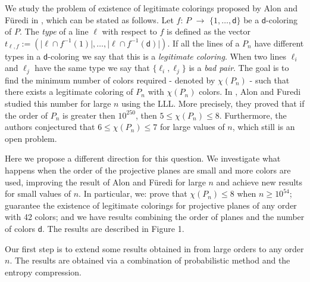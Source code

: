 \documentclass[11pt]{amsart}
\numberwithin{equation}{section}
\begin{document}
We study the problem of existence of legitimate colorings proposed by Alon and F\"uredi in \cite{Alon}, which can be stated as follows. Let $f$: $P$ $\rightarrow$ $\lbrace 1,\ldots, \mathsf{d} \rbrace$ be a $\mathsf{d}$-coloring of $P$. The \textit{type} of a line $\ell$ with respect to $f$ is defined as the vector $t_{\ell,f} := ( \vert \ell \cap f^{-1}(1) \vert, \ldots , \vert \ell \cap f^{-1}(\mathsf{d}) \vert  )$. If all the lines of a $P_n$ have different types in a $\mathsf{d}$-coloring we say that this is a \textit{legitimate coloring}. When two lines  $\ell_i$ and $\ell_j$ have the same type we say that  $\lbrace \ell_i,\ell_j \rbrace$ is a \textit{bad pair}. The goal is to find the minimum number of colors required - denoted by $\chi(P_n)$ - such that there exists a legitimate coloring of $P_n$ with $\chi(P_n)$ colors. In \cite{Alon}, Alon and  F$\ddot{\text{u}}$redi studied this number for large $n$ using the LLL. More precisely, they proved that if the order of $P_n$ is greater then  $10^{250}$, then  $5 \leqslant \chi(P_n) \leqslant 8$. Furthermore, the authors conjectured that $6 \leqslant \chi(P_n) \leqslant 7$ for large values of $n$, which still is an open problem.

Here we propose a different direction for this question. We investigate what happens when the order of the projective planes are small and more colors are used,  improving the result of Alon and F\"uredi for large $n$ and achieve new results for small values of $n$. In particular, we: prove that $\chi(P_n) \leqslant 8$ when $n \geq 10^{54}$;  guarantee the existence of legitimate colorings for projective planes of any order with 42 colors; and we have results combining the order of planes and the number of colors $\mathsf{d}$. The results are described in Figure 1. 

Our first step is to extend some results obtained in \cite{Alon} from large orders to any order $n$. The results are obtained via a combination of probabilistic method and the entropy compression. 

\\
\end{document}
